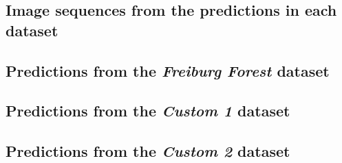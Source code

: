 \documentclass[USenglish]{ifimaster}  %
\begin{document}
\begin{appendices}
\chapter{Image sequences from the predictions in each dataset}\label{appendix}
\section{Predictions from the \textit{Freiburg Forest} dataset}\label{appendix_freiburg}
\section{Predictions from the \textit{Custom 1} dataset}\label{appendix_1}
\section{Predictions from the \textit{Custom 2} dataset}\label{appendix_2}
\end{appendices}

\backmatter{}
\printbibliography
\end{document}
